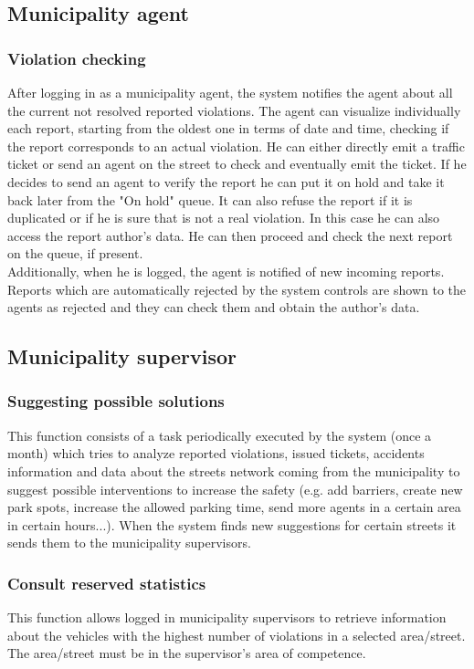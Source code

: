 \documentclass[a4paper]{report}
\begin{document}
\subsection{Municipality agent}
\label{sub-agentfun}
\subsubsection{Violation checking}
After logging in as a municipality agent, the system notifies the agent about all the current not resolved reported violations. The agent can visualize individually each report, starting from the oldest one in terms of date and time, checking if the report corresponds to an actual violation. He can either directly emit a traffic ticket or send an agent on the street to check and eventually emit the ticket.  If he decides to send an agent to verify the report he can put it on hold and take it back later from the "On hold" queue. It can also refuse the report if it is duplicated or if he is sure that is not a real violation. In this case he can also access the report author's data. He can then proceed and check the next report on the queue, if present.\\
Additionally, when he is logged, the agent is notified of new incoming reports.\\
Reports which are automatically rejected by the system controls are shown to the agents as rejected and they can check them and obtain the author's data.

\subsection{Municipality supervisor}

\subsubsection{Suggesting possible solutions} 
This function consists of a task periodically executed by the system (once a month) which tries to analyze reported violations, issued tickets, accidents information and data about the streets network coming from the municipality to suggest possible interventions to increase the safety (e.g. add barriers, create new park spots, increase the allowed parking time, send more agents in a certain area in certain hours...). When the system finds new suggestions for certain streets it sends them to the municipality supervisors.

\subsubsection{Consult reserved statistics}
This function allows logged in municipality supervisors to retrieve information about the vehicles with the highest number of violations in a selected area/street. The area/street must be in the supervisor's area of competence.
\end{document}
